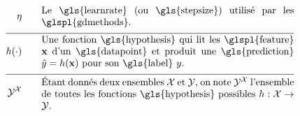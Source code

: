 \begin{align}
	\lrate  \quad\quad & \parbox{.75\textwidth}{Le \gls{learnrate} (ou \gls{stepsize}) utilisé par les \glspl{gdmethods}.}  \nonumber \\[2mm] \hline \nonumber\\[-5mm]
	\hypothesis(\cdot)  \quad\quad &\parbox{.75\textwidth}{Une fonction \gls{hypothesis} qui lit les \glspl{feature} $\featurevec$ d’un \gls{datapoint} et produit une \gls{prediction} $\hat{\truelabel}=\hypothesis(\featurevec)$ pour son \gls{label} $\truelabel$.}  	 \nonumber \\[2mm] \hline \nonumber\\[-5mm]
	\labelspace^{\featurespace} \quad\quad & \parbox{.75\textwidth}{Étant donnés deux ensembles $\featurespace$ et $\labelspace$, on note $\labelspace^{\featurespace}$ l’ensemble de toutes les fonctions \gls{hypothesis} possibles $\hypothesis: \featurespace \rightarrow \labelspace$.} 	 \nonumber 
\end{align}
                  


